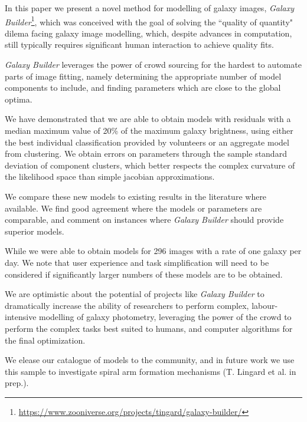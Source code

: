 \documentclass[../main.tex]{subfiles}
\begin{document}
\label{sec:conclusions}
In this paper we present a novel method for modelling of galaxy images, \textit{Galaxy Builder}\footnote{\url{https://www.zooniverse.org/projects/tingard/galaxy-builder/}}, which was conceived with the goal of solving the ``quality of quantity" dilema facing galaxy image modelling, which, despite advances in computation, still typically requires significant human interaction to achieve quality fits.

\textit{Galaxy Builder} leverages the power of crowd sourcing for the hardest to automate parts of image fitting, namely determining the appropriate number of model components to include, and finding parameters which are close to the global optima.

We have demonstrated that we are able to obtain models with residuals with a median maximum value of 20\% of the maximum galaxy brightness, using either the best individual classification provided by volunteers or an aggregate model from clustering. We obtain errors on parameters through the sample standard deviation of component clusters, which better respects the complex curvature of the likelihood space than simple jacobian approximations.

We compare these new models to existing results in the literature where available. We find good agreement where the models or parameters are comparable, and comment on instances where \textit{Galaxy Builder} should provide superior models.

While we were able to obtain models for 296 images with a rate of one galaxy per day. We note that user experience and task simplification will need to be considered if significantly larger numbers of these models are to be obtained.

We are optimistic about the potential of projects like \textit{Galaxy Builder} to dramatically increase the ability of researchers to perform complex, labour-intensive modelling of galaxy photometry, leveraging the power of the crowd to perform the complex tasks best suited to humans, and computer algorithms for the final optimization.

We elease our catalogue of models to the community, and in future work we use this sample to investigate spiral arm formation mechanisms (T. Lingard et al. in prep.).
\end{document}
